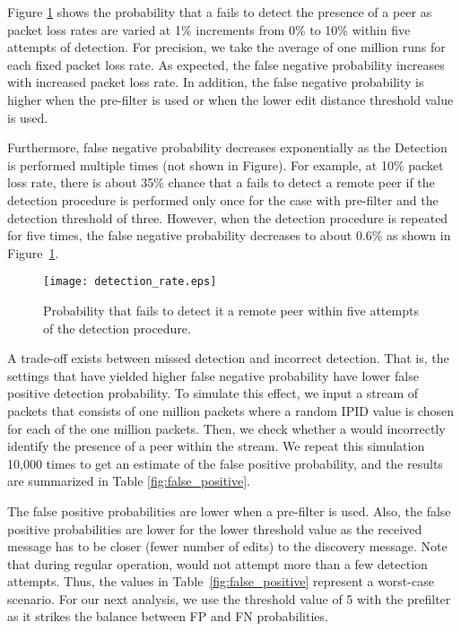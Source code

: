 Figure \ref{fig:false_negative} shows the probability that a \name fails to
detect the presence of a peer as packet loss rates are varied at 1\% increments
from 0\% to 10\% within five attempts of \name detection. For precision, we
take the average of one million runs for each fixed packet loss rate. As
expected, the false negative probability increases with increased packet loss
rate. In addition, the false negative probability is higher when the pre-filter
is used or when the lower edit distance threshold value is used.

Furthermore, false negative probability decreases exponentially as the \name
Detection is performed multiple times (not shown in Figure). For example, at
10\% packet loss rate, there is about 35\% chance that a \name fails to detect
a remote peer if the detection procedure is performed only once for the case
with pre-filter and the detection threshold of three.  However, when the
detection procedure is repeated for five times, the false negative probability
decreases to about 0.6\% as shown in Figure~\ref{fig:false_negative}.

\begin{figure}[h]
\centering
\texttt{[image: detection\_rate.eps]}
\caption{Probability that \name fails to detect it a remote peer within five
attempts of the detection procedure.}
\label{fig:false_negative}
\end{figure}

A trade-off exists between missed detection and incorrect detection. That is,
the settings that have yielded higher false negative probability have lower
false positive detection probability. To simulate this effect, we input a
stream of packets that consists of one million packets where a random IPID
value is chosen for each of the one million packets. Then, we check whether a
\name would incorrectly identify the presence of a peer within the stream. We
repeat this simulation 10,000 times to get an estimate of the false positive
probability, and the results are summarized in Table \ref{fig:false_positive}.

The false positive probabilities are lower when a pre-filter is used. Also, the
false positive probabilities are lower for the lower threshold value as the
received message has to be closer (\ie fewer number of edits) to the discovery
message. Note that during regular operation, \name would not attempt more than
a few detection attempts. Thus, the values in Table~\ref{fig:false_positive}
represent a worst-case scenario. For our next analysis, we use the threshold
value of 5 with the prefilter as it strikes the balance between FP and FN
probabilities.


